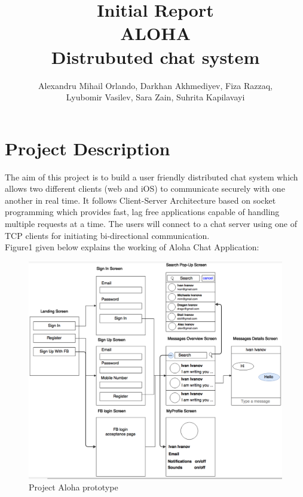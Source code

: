 \documentclass[12pt]{article}
\title{Initial Report\\ ALOHA \\Distrubuted chat system}
\author{Alexandru Mihail Orlando, Darkhan Akhmediyev, Fiza Razzaq, \\ Lyubomir Vasilev, Sara Zain, Suhrita Kapilavayi}
\begin{document}
 

\maketitle

\section{Project Description}

The aim of this project is to build a user friendly distributed chat system which allows two different clients (web and iOS) to communicate securely with one another in real time. It follows Client-Server Architecture based on socket programming which provides fast, lag free applications capable of handling multiple requests at a time. The users will connect to a chat server using one of TCP clients for initiating bi-directional communication. \\
Figure1 given below explains the working of Aloha Chat Application:

\begin{figure}[ht!]
\centering
\includegraphics[width=1\textwidth, hsize=0.8\hsize]{Design.png}
\caption{Project Aloha prototype}
\label{fig:figgantt}
\end{figure}
\end{document}
